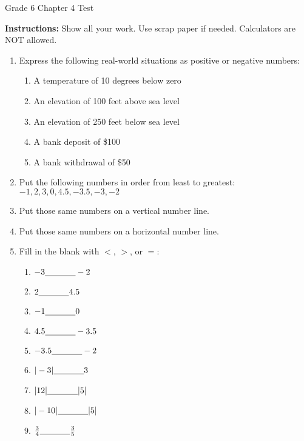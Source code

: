 \documentclass[12pt]{article}
\begin{document}
\centerline{\Large Grade 6 Chapter 4 Test}
\vspace{0.5in}

\textbf{Instructions:} Show all your work. Use scrap paper if needed. Calculators are NOT allowed.

\begin{enumerate}
    \item Express the following real-world situations as positive or negative numbers:
    \begin{enumerate}
        \item A temperature of 10 degrees below zero
        \item An elevation of 100 feet above sea level
        \item An elevation of 250 feet below sea level
        \item A bank deposit of \$100
        \item A bank withdrawal of \$50
    \end{enumerate}
    \item Put the following numbers in order from least to greatest: 
    \newline $-1, 2, 3, 0, 4.5, -3.5, -3,-2$
    \item Put those same numbers on a vertical number line.
    \item Put those same numbers on a horizontal number line.
    \item Fill in the blank with $<$, $>$, or $=$:
    \begin{enumerate}
        \item $-3 \underline{\hspace{0.5in}} -2$
        \item $2 \underline{\hspace{0.5in}} 4.5$
        \item $-1 \underline{\hspace{0.5in}} 0$
        \item $4.5 \underline{\hspace{0.5in}} -3.5$
        \item $-3.5 \underline{\hspace{0.5in}} -2$
        \item $|-3| \underline{\hspace{0.5in}} 3$
        \item $|12| \underline{\hspace{0.5in}} |5|$
        \item $|-10| \underline{\hspace{0.5in}} |5|$
        \item $\frac{3}{4} \underline{\hspace{0.5in}} \frac{3}{5}$
    \end{enumerate}

\end{enumerate}
\end{document}
